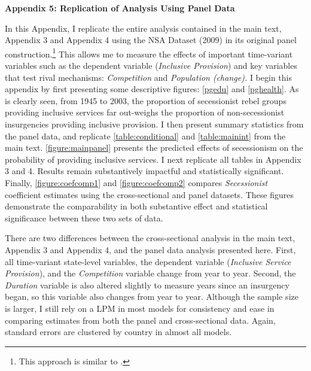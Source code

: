 \documentclass[12pt, letterpaper]{article}
\begin{document}
\newpage
\clearpage
\thispagestyle{plain}

\begin{center}
\Large{\textbf{Appendix 5: Replication of Analysis Using Panel Data}}
\end{center}

\normalsize

In this Appendix, I replicate the entire analysis contained in the main text, Appendix 3 and Appendix 4 using the NSA Dataset (2009) in its original panel construction.\footnote{This approach is similar to \citet{fortna2015terrorists}.} This allows me to measure the effects of important time-variant variables such as the dependent variable (\textit{Inclusive Provision}) and key variables that test rival mechanisms: \textit{Competition} and \textit{Population (change).} I begin this appendix by first presenting some descriptive figures: \autoref{pgedu} and \autoref{pghealth}. As is clearly seen, from 1945 to 2003, the proportion of secessionist rebel groups providing inclusive services far out-weighs the proportion of non-secessionist insurgencies providing inclusive provision. I then present summary statistics from the panel data, and replicate \autoref{table:conditional} and \autoref{table:mainint} from the main text. \autoref{figure:mainpanel} presents the predicted effects of secessionism on the probability of providing inclusive services. I next replicate all tables in Appendix 3 and 4. Results remain substantively impactful and statistically significant. Finally, \autoref{figure:coefcomp1} and \autoref{figure:coefcomp2} compares \textit{Secessionist} coefficient estimates using the cross-sectional and panel datasets. These figures demonstrate the comparability in both substantive effect and statistical significance between these two sets of data.  

There are two differences between the cross-sectional analysis in the main text, Appendix 3 and Appendix 4, and the panel data analysis presented here. First, all time-variant state-level variables, the dependent variable (\textit{Inclusive Service Provision}), and the \textit{Competition} variable change from year to year. Second, the \textit{Duration} variable is also altered slightly to measure years since an insurgency began, so this variable also changes from year to year. Although the sample size is larger, I still rely on a LPM in most models for consistency and ease in comparing estimates from both the panel and cross-sectional data. Again, standard errors are clustered by country in almost all models.
\end{document}
